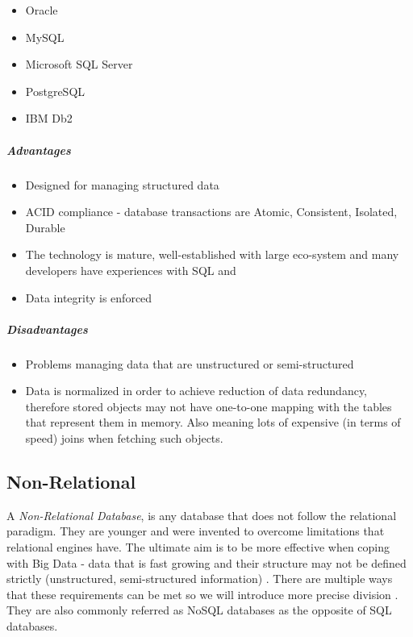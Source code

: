 \begin{itemize}
	\item Oracle
	\item MySQL
	\item Microsoft SQL Server
	\item PostgreSQL
	\item IBM Db2
\end{itemize}

\subparagraph{Advantages}
\cite{RelationalVsNonRelationalDatabases1} \cite{RelationalVsNonRelationalDatabases2}

\begin{itemize}
	\item Designed for managing structured data
	\item ACID compliance - database transactions are Atomic, Consistent, Isolated, Durable
	\item The technology is mature, well-established with large eco-system and many developers have experiences with SQL and 
	\item Data integrity is enforced
\end{itemize}

\subparagraph{Disadvantages}

\begin{itemize}
	\item Problems managing data that are unstructured or semi-structured
	\item Data is normalized in order to achieve reduction of data redundancy, therefore stored objects may not have one-to-one mapping with the tables that represent them in memory. Also meaning lots of expensive (in terms of speed) joins when fetching such objects.
\end{itemize}

\subsection{Non-Relational}
A \textit{Non-Relational Database}, is any database that does not follow the relational paradigm. They are younger and were invented to overcome limitations that relational engines have. 
The ultimate aim is to be more effective when coping with Big Data - data that is fast growing and their structure may not be defined strictly (unstructured, semi-structured information) \cite{NonRelationalDBs}.
There are multiple ways that these requirements can be met so we will introduce more precise division \cite{DatabaseTypes}.
They are also commonly referred as NoSQL databases as the opposite of SQL databases.


